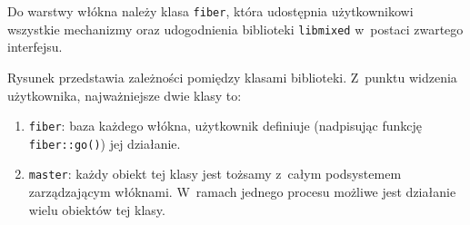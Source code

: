 \documentclass[12pt]{mwart}
\newcommand{\code}{\texttt}
\newcommand{\dcolon}{::}
\newcommand{\procbr}{()}
\newcommand{\function}[1]{\code{#1\procbr}}
\begin{document}
  Do warstwy włókna należy klasa \code{fiber}, która udostępnia użytkownikowi wszystkie mechanizmy oraz udogodnienia biblioteki \code{libmixed} w~postaci
  zwartego interfejsu.
\par
\indent
  Rysunek  przedstawia zależności pomiędzy klasami biblioteki. Z~punktu widzenia użytkownika, najważniejsze dwie klasy to:
  \begin{enumerate}
    \item \code{fiber}: baza każdego włókna, użytkownik definiuje (nadpisując funkcję \function{fiber\dcolon go}) jej działanie.
    \item \code{master}: każdy obiekt tej klasy jest tożsamy z~całym podsystemem zarządzającym włóknami. W~ramach jednego procesu możliwe jest działanie wielu
      obiektów tej klasy.
  \end{enumerate}
\par
%
\newpage
\end{document}
